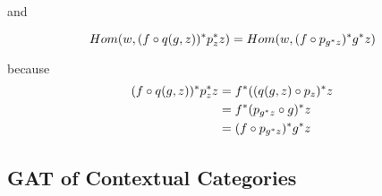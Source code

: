 \documentclass[10pt,a4paper]{scrartcl}
\begin{document}
and

\begin{equation*}
     Hom(w,(f \circ q(g,z) ) ^* p_z ^* z ) = Hom(w,(f \circ   p_{g ^* z} ) ^*  g ^* z )
\end{equation*}

because
\begin{align*}
(f \circ q(g,z) ) ^* p_z ^* z 
                 & = f ^* ((q(g,z) \circ p_z) ^* z \\
                 & = f ^* ( p_{g ^* z} \circ g ) ^* z\\
                 & = (f \circ   p_{g ^* z} ) ^*  g ^* z
\end{align*}

\subsection{GAT of Contextual Categories}
\end{document}
